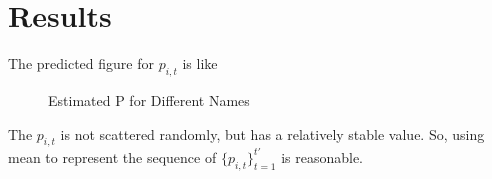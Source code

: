 \documentclass[journal]{IEEEtran}
\begin{document}
\section{Results} %
\label{sec:results}
The predicted figure for $p_{i, t}$ is like 
\begin{figure}[ht]
\centering
{}
\quad
{}

\caption{Estimated P for Different Names}
\label{Estimated P for Different Names}
\end{figure}

The $p_{i, t}$ is not scattered randomly, but has a relatively stable value. So, using mean to represent the sequence of $\{p_{i, t}\}_{t = 1}^{t'}$ is reasonable.
\end{document}
